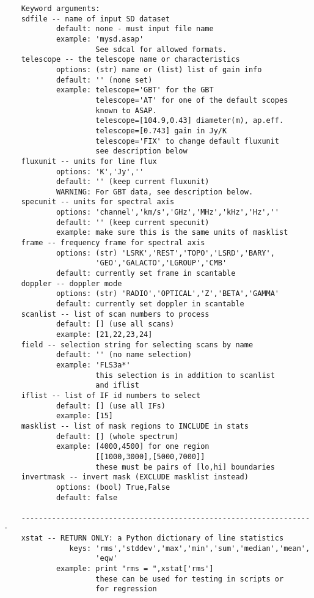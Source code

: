 \begin{itemize}
\begin{verbatim}
    Keyword arguments:
    sdfile -- name of input SD dataset
            default: none - must input file name
            example: 'mysd.asap'
                     See sdcal for allowed formats.
    telescope -- the telescope name or characteristics
            options: (str) name or (list) list of gain info
            default: '' (none set)
            example: telescope='GBT' for the GBT
                     telescope='AT' for one of the default scopes
                     known to ASAP.
                     telescope=[104.9,0.43] diameter(m), ap.eff.
                     telescope=[0.743] gain in Jy/K
                     telescope='FIX' to change default fluxunit
                     see description below
    fluxunit -- units for line flux
            options: 'K','Jy',''
            default: '' (keep current fluxunit)
            WARNING: For GBT data, see description below.
    specunit -- units for spectral axis
            options: 'channel','km/s','GHz','MHz','kHz','Hz',''
            default: '' (keep current specunit)
            example: make sure this is the same units of masklist
    frame -- frequency frame for spectral axis
            options: (str) 'LSRK','REST','TOPO','LSRD','BARY',
                     'GEO','GALACTO','LGROUP','CMB'
            default: currently set frame in scantable
    doppler -- doppler mode
            options: (str) 'RADIO','OPTICAL','Z','BETA','GAMMA'
            default: currently set doppler in scantable
    scanlist -- list of scan numbers to process
            default: [] (use all scans)
            example: [21,22,23,24]
    field -- selection string for selecting scans by name
            default: '' (no name selection)
            example: 'FLS3a*'
                     this selection is in addition to scanlist
                     and iflist
    iflist -- list of IF id numbers to select
            default: [] (use all IFs)
            example: [15]
    masklist -- list of mask regions to INCLUDE in stats
            default: [] (whole spectrum)
            example: [4000,4500] for one region
                     [[1000,3000],[5000,7000]]
                     these must be pairs of [lo,hi] boundaries
    invertmask -- invert mask (EXCLUDE masklist instead)
            options: (bool) True,False
            default: false
    
    -------------------------------------------------------------------
    xstat -- RETURN ONLY: a Python dictionary of line statistics
               keys: 'rms','stddev','max','min','sum','median','mean',
                     'eqw'
            example: print "rms = ",xstat['rms']
                     these can be used for testing in scripts or
                     for regression
                     

\end{verbatim}
\end{itemize}
